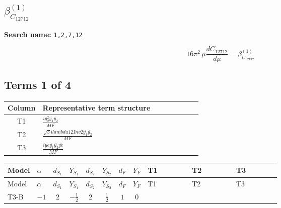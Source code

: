 \documentclass[8pt]{article}
\begin{document}
\begin{landscape}
\section*{$\beta_{C_{12712}}^{(1)}$}
\noindent\textbf{Search name: }\texttt{1,2,7,12}\par\smallskip
\[16\pi^2\,\mu\frac{d C_{12712}}{d\mu}=\beta_{C_{12712}}^{(1)}\]
\subsection*{Terms 1 of 4}
\begin{center}
\begin{tabular}{@{}c >{\raggedright\arraybackslash}p{0.82\linewidth}@{}}
\toprule
Column & Representative term structure \\
\midrule
T1 & \(\displaystyle \frac{i g_{2}^{2} \overline{y_{1}} \overline{y_{2}}}{MF}\) \\
\midrule
T2 & \(\displaystyle \frac{\sqrt{3} i lambda12Inv2 \overline{y_{1}} \overline{y_{2}}}{MF}\) \\
\midrule
T3 & \(\displaystyle \frac{i ye \overline{y_{1}} \overline{y_{2}} \overline{ye}}{MF}\) \\
\midrule
\bottomrule
\end{tabular}
\end{center}
\smallskip
\tiny
\begin{longtable}{@{}llcccccc >{\raggedright\arraybackslash}p{0.21\linewidth} >{\raggedright\arraybackslash}p{0.21\linewidth} >{\raggedright\arraybackslash}p{0.21\linewidth}@{}}
\toprule
Model & $\alpha$ & $d_{S_1}$ & $Y_{S_1}$ & $d_{S_2}$ & $Y_{S_2}$ & $d_F$ & $Y_F$ & T1 & T2 & T3 \\
\midrule
\endfirsthead
\toprule
Model & $\alpha$ & $d_{S_1}$ & $Y_{S_1}$ & $d_{S_2}$ & $Y_{S_2}$ & $d_F$ & $Y_F$ & T1 & T2 & T3 \\
\midrule
\endhead
T3-B & $-1$ & $2$ & $-\frac{1}{2}$ & $2$ & $\frac{1}{2}$ & $1$ & $0$ & \scriptsize\adjustbox{max width=\linewidth}{$\begin{gathered} - \frac{3 i g_{2}^{2} \overline{y_{1}} \overline{y_{2}}}{8 MF}\end{gathered}$} & \scriptsize\adjustbox{max width=\linewidth}{$\begin{gathered} - \frac{\sqrt{3} i lambda12Inv2 \overline{y_{1}} \overline{y_{2}}}{6 MF}\end{gathered}$} & \scriptsize\adjustbox{max width=\linewidth}{$\begin{gathered} \frac{i ye \overline{y_{1}} \overline{y_{2}} \overline{ye}}{8 MF}\end{gathered}$} \\

\end{longtable}
\end{landscape}
\end{document}
